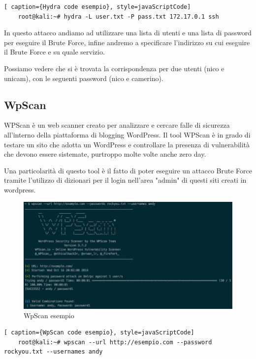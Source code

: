 \begin{lstlisting}[ caption={Hydra code esempio}, style=javaScriptCode]
    root@kali:~# hydra -L user.txt -P pass.txt 172.17.0.1 ssh
\end{lstlisting}

In questo attacco andiamo ad utilizzare una lista di utenti e una lista di password per eseguire il Brute Force, infine andremo a specificare l'indirizzo su cui eseguire il Brute Force e su quale servizio.

Possiamo vedere che si è trovata la corrispondenza per due utenti (nico e unicam), con le seguenti password (nico e camerino). 
\newpage

\subsection{WpScan}

WPScan\cite{wpscan} è un web scanner creato per analizzare e cercare falle di sicurezza all’interno della piattaforma di blogging WordPress. Il tool WPScan è in grado di testare un sito che adotta un WordPress e controllare la presenza di vulnerabilità che devono essere sistemate, purtroppo molte volte anche zero day.

Una particolarità di questo tool è il fatto di poter eseguire un attacco Brute Force tramite l'utilizzo di dizionari per il login nell'area "admin" di questi siti creati in wordpress.

\begin{figure}[htpb!]
    \centering
    \includegraphics[width=\linewidth]{Immagini/5/wpscan_example.png}
    \caption{WpScan esempio\cite{wpscan_esempio}}
    \label{fig:WpScan esempio}
\end{figure}

\begin{lstlisting}[ caption={WpScan code esempio}, style=javaScriptCode]
    root@kali:~# wpscan --url http://esempio.com --password rockyou.txt --usernames andy
\end{lstlisting}

